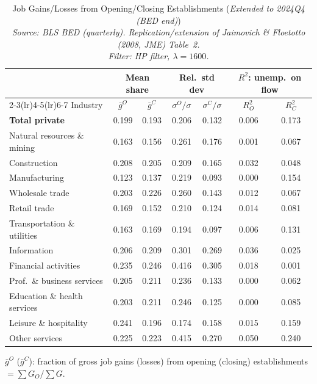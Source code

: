 \begin{table}[htbp]
\centering
\small
\caption{Job Gains/Losses from Opening/Closing Establishments (\emph{Extended to 2024Q4 (BED end)}) \\
  \emph{Source: BLS BED (quarterly). Replication/extension of Jaimovich \& Floetotto (2008, JME) Table~2.} \\  \emph{Filter: HP filter, $\lambda=1600$.}}
\label{tab:jf_t2_ext_2024_hp}
\begin{tabular}{lcccccc}
\toprule
 & \multicolumn{2}{c}{Mean share} & \multicolumn{2}{c}{Rel.\ std dev} & \multicolumn{2}{c}{$R^2$: unemp.\ on flow} \\
\cmidrule(lr){2-3}\cmidrule(lr){4-5}\cmidrule(lr){6-7}
Industry & $\bar{g}^O$ & $\bar{g}^C$ & $\sigma^O/\sigma$ & $\sigma^C/\sigma$ & $R^2_O$ & $R^2_C$ \\
\midrule
\midrule
\textbf{Total private} & 0.199 & 0.193 & 0.206 & 0.132 & 0.006 & 0.173 \\
Natural resources \& mining & 0.163 & 0.156 & 0.261 & 0.176 & 0.001 & 0.067 \\
Construction & 0.208 & 0.205 & 0.209 & 0.165 & 0.032 & 0.048 \\
Manufacturing & 0.123 & 0.137 & 0.219 & 0.093 & 0.000 & 0.154 \\
Wholesale trade & 0.203 & 0.226 & 0.260 & 0.143 & 0.012 & 0.067 \\
Retail trade & 0.169 & 0.152 & 0.210 & 0.124 & 0.014 & 0.081 \\
Transportation \& utilities & 0.163 & 0.169 & 0.194 & 0.097 & 0.006 & 0.131 \\
Information & 0.206 & 0.209 & 0.301 & 0.269 & 0.036 & 0.025 \\
Financial activities & 0.235 & 0.246 & 0.416 & 0.305 & 0.018 & 0.001 \\
Prof.~\& business services & 0.205 & 0.211 & 0.236 & 0.133 & 0.000 & 0.062 \\
Education \& health services & 0.203 & 0.211 & 0.246 & 0.125 & 0.000 & 0.085 \\
Leisure \& hospitality & 0.241 & 0.196 & 0.174 & 0.158 & 0.015 & 0.159 \\
Other services & 0.225 & 0.223 & 0.415 & 0.270 & 0.050 & 0.240 \\
\bottomrule
\end{tabular}
\begin{tablenotes}[flushleft]\footnotesize
\item $\bar{g}^O$ ($\bar{g}^C$): fraction of gross job gains (losses) from opening (closing) establishments $= \sum G_O / \sum G$.

\end{tablenotes}
\end{table}

